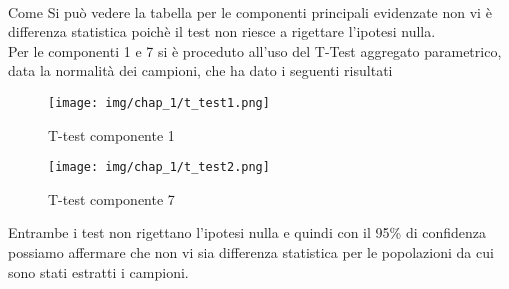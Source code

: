 \\
Come Si può vedere la tabella per le componenti principali evidenzate non vi è differenza statistica poichè il test non riesce a rigettare l'ipotesi nulla.\\
Per le componenti 1 e 7 si è proceduto all'uso del T-Test aggregato parametrico, data la normalità dei campioni, che ha dato i seguenti risultati 
\begin{figure}[H]
    \centering
    \texttt{[image: img/chap\_1/t\_test1.png]}
    \caption{T-test componente 1}
    \label{fig:t_test1}
\end{figure}
\noindent
\begin{figure}[H]
    \centering
    \texttt{[image: img/chap\_1/t\_test2.png]}
    \caption{T-test componente 7}
    \label{fig:t_test2}
\end{figure}
\noindent
Entrambe i test non rigettano l'ipotesi nulla e quindi con il 95\% di confidenza possiamo affermare che non vi sia differenza statistica per le popolazioni da cui sono stati estratti i campioni.
